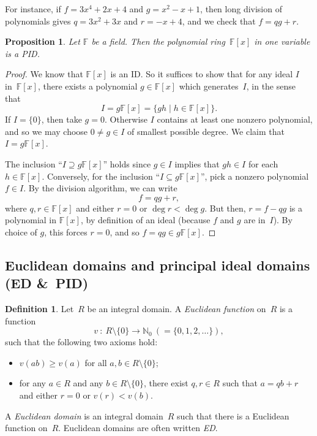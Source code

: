 \documentclass[12pt]{article}
\newtheorem{prop}[thm]{Proposition}
\theoremstyle{definition}
\newtheorem{defn}[thm]{Definition}
\newcounter{ex}\renewcommand\theex{\arabic{ex}}
\newcommand{\N}{\ensuremath{\mathbb{N}}}
\newcommand{\F}{\ensuremath{\mathbb{F}}}
\begin{document}
For instance, if
$f=3x^4+2x+4$ and $g=x^2-x+1$, then
long division of polynomials gives
$q=3x^2+3x$ and $r=-x+4$, and we check that $f=qg+r$.



\begin{prop}\label{prop:poly-ed}
Let $\F$ be a field. Then the polynomial ring~$\F[x]$ in one variable
is a PID. 
\end{prop}

\begin{proof}
We know that $\F[x]$ is an ID. So it suffices to show that for
any ideal $I$ in~$\F[x]$, there exists a polynomial $g\in\F[x]$
which generates~$I$, in the sense that
$$I=g\F[x]={\{gh\mid h\in\F[x]\}.}$$
If $I=\{0\}$, then take $g=0$. Otherwise $I$
contains at least one nonzero polynomial, and so we may choose 
$0\neq g\in I$ of smallest possible degree. We claim that
$I=g\F[x]$. 

The inclusion ``$I\supseteq g\F[x]$'' holds since $g\in I$
implies that $gh\in I$ for each $h\in\F[x]$. Conversely, for the inclusion
``$I\subseteq g\F[x]$'', pick a nonzero polynomial $f\in I$.
By the division algorithm, we can write
$${f=qg+r,}$$
where $q,r\in\F[x]$ and
either $r= 0$ or $\deg r<\deg g$. But then,
$r=f-qg$ is a polynomial in $\F[x]$, by definition of
an ideal (because $f$ and $g$ are in~$I$).
By choice of $g$, this forces $r=0$, and so
$f=qg\in g\F[x]$.
\end{proof}


\subsection{Euclidean domains and principal ideal domains (ED \&\ PID)}\label{ssec:ed}

\begin{defn}\label{def:ed} 
Let~$R$ be an integral domain. 
A {\em Euclidean function} on~$R$ is a function
$$v~:~R \setminus \{0\} \to \N_0\ (= \{0,1,2,\dots\}),$$
such that the following two axioms hold:
\begin{itemize}
\item $v(ab)\geq v(a)$ for all $a, b\in R\setminus\{0\}$;
\item for any $a\in R$ and any $b\in R\setminus\{0\}$, there exist
$q,r\in R$ such that $a=qb+r$ and either $r=0$ or $v(r)<v(b)$. 
\end{itemize}
A {\em Euclidean domain} is an integral
domain~$R$ such that there is a Euclidean function on~$R$. Euclidean
domains are often written {\em ED}.
\end{defn}
\end{document}
